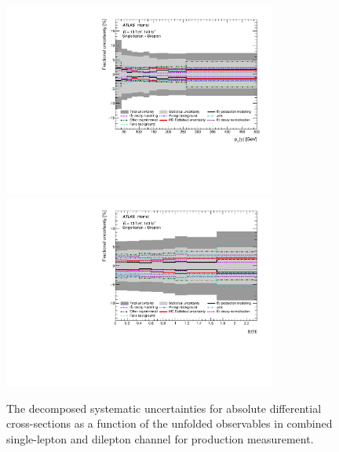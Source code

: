 \begin{figure}[ht]
  \centering
  \includegraphics[width=0.80\textwidth]{figures/diff_xsec/groupedimpact-absolute-xsec/tty_prod_SLDL/GroupedImpact_tty_prod_pt_SLDL.pdf}\\
  \includegraphics[width=0.80\textwidth]{figures/diff_xsec/groupedimpact-absolute-xsec/tty_prod_SLDL/GroupedImpact_tty_prod_eta_SLDL.pdf}%
\caption{The decomposed systematic uncertainties for absolute differential cross-sections as a function of the unfolded observables in combined single-lepton and dilepton channel for \tty production measurement.}
\label{fig:tty_prod_diff_SLDL_groupedimpact}
\end{figure}
\FloatBarrier

